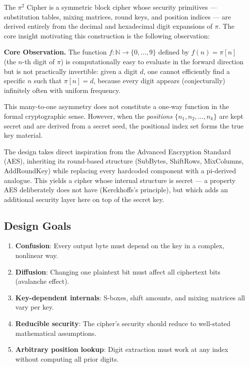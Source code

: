 \documentclass[12pt, a4paper]{article}
\begin{document}
The $\pi^2$ Cipher is a symmetric block cipher whose security primitives — substitution tables, mixing matrices, round keys, and position indices — are derived entirely from the decimal and hexadecimal digit expansions of $\pi$. The core insight motivating this construction is the following observation:

\begin{highlight}
\textbf{Core Observation.} The function $f : \mathbb{N} \to \{0, \ldots, 9\}$ defined by $f(n) = \pi[n]$ (the $n$-th digit of $\pi$) is computationally easy to evaluate in the forward direction but is not practically invertible: given a digit $d$, one cannot efficiently find a specific $n$ such that $\pi[n] = d$, because every digit appears (conjecturally) infinitely often with uniform frequency.
\end{highlight}

This many-to-one asymmetry does not constitute a one-way function in the formal cryptographic sense. However, when the \emph{positions} $\{n_1, n_2, \ldots, n_k\}$ are kept secret and are derived from a secret seed, the positional index set forms the true key material.

The design takes direct inspiration from the Advanced Encryption Standard (AES), inheriting its round-based structure (SubBytes, ShiftRows, MixColumns, AddRoundKey) while replacing every hardcoded component with a pi-derived analogue. This yields a cipher whose internal structure is secret — a property AES deliberately does not have (Kerckhoffs's principle), but which adds an additional security layer here on top of the secret key.

\subsection{Design Goals}

\begin{enumerate}[leftmargin=*, label=\arabic*.]
  \item \textbf{Confusion}: Every output byte must depend on the key in a complex, nonlinear way.
  \item \textbf{Diffusion}: Changing one plaintext bit must affect all ciphertext bits (avalanche effect).
  \item \textbf{Key-dependent internals}: S-boxes, shift amounts, and mixing matrices all vary per key.
  \item \textbf{Reducible security}: The cipher's security should reduce to well-stated mathematical assumptions.
  \item \textbf{Arbitrary position lookup}: Digit extraction must work at any index without computing all prior digits.
\end{enumerate}
\end{document}
